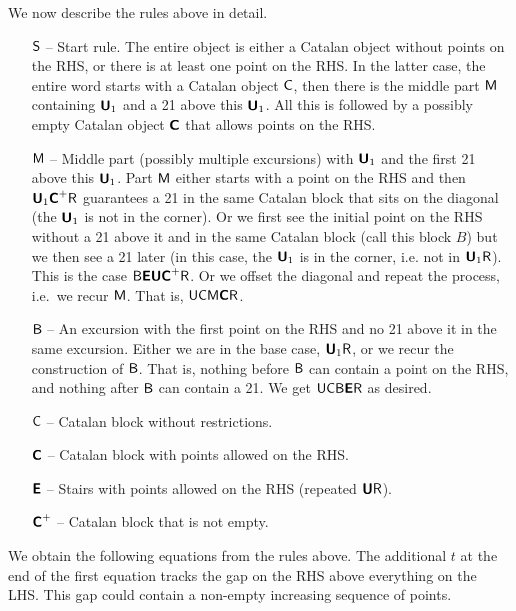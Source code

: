\noindent We now describe the rules above in detail. 

\begin{enumerate}
\item[$\mathsf{S}$ --] Start rule. The entire object is either a Catalan object without points on the RHS, or there is at least one point on the RHS. In the latter case, the entire word starts with a Catalan object $\mathsf{C}$, then there is the middle part $\mathsf{M}$ containing $\textbf{\textsf{U}}_1$ and a 21 above this $\textbf{\textsf{U}}_1$. All this is followed by a possibly empty Catalan object $\textbf{\textsf{C}}$ that allows points on the RHS.
\item[$\mathsf{M}$ --] Middle part (possibly multiple excursions) with $\textbf{\textsf{U}}_1$ and the first 21 above this $\textbf{\textsf{U}}_1$. Part $\mathsf{M}$ either starts with a point on the RHS and then $\textbf{\textsf{U}}_1\textbf{\textsf{C}}^+\mathsf{R}$ guarantees a 21 in the same Catalan block that sits on the diagonal (the $\textbf{\textsf{U}}_1$ is not in the corner). Or we first see the initial point on the RHS without a 21 above it and in the same Catalan block (call this block $B$) but we then see a 21 later (in this case, the $\textbf{\textsf{U}}_1$ is in the corner, i.e. not in $\textbf{\textsf{U}}_1\mathsf{R}$). This is the case $\mathsf{B}\textbf{\textsf{E}}\textbf{\textsf{U}}\textbf{\textsf{C}}^+\mathsf{R}$. Or we offset the diagonal and repeat the process, i.e.~we recur $\mathsf{M}$. That is, $\mathsf{U}\mathsf{C}\mathsf{M}\textbf{\textsf{C}}\mathsf{R}$.
\item[$\mathsf{B}$ --] An excursion with the first point on the RHS and no 21 above it in the same excursion. Either we are in the base case, $\textbf{\textsf{U}}_1\mathsf{R}$, or we recur the construction of $\mathsf{B}$. That is, nothing before $\mathsf{B}$ can contain a point on the RHS, and nothing after $\mathsf{B}$ can contain a 21. We get $\mathsf{U}\mathsf{C}\mathsf{B}\textbf{\textsf{E}}\mathsf{R}$ as desired.
\item[$\mathsf{C}$ --] Catalan block without restrictions.
\item[$\textbf{\textsf{C}}$ --] Catalan block with points allowed on the RHS.
\item[$\textbf{\textsf{E}}$ --] Stairs with points allowed on the RHS (repeated $\textbf{\textsf{U}}\mathsf{R}$).
\item[$\textbf{\textsf{C}}^+$ --] Catalan block that is not empty.
\end{enumerate}

\noindent We obtain the following equations from the rules above. The additional $t$ at the end of the first equation tracks the gap on the RHS above everything on the LHS. This gap could contain a non-empty increasing sequence of points. 

